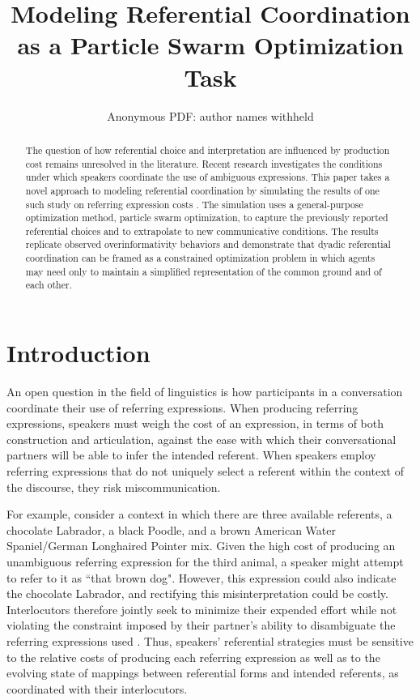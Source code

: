 \documentclass[a4paper,11pt]{article}
\title{Modeling Referential Coordination as a Particle Swarm Optimization Task}
\author{ Anonymous PDF:  author names withheld\\}
\date{}
\begin{document}
\maketitle
\begin{abstract}
The question of how referential choice and interpretation are influenced by production cost remains unresolved in the literature. Recent research \cite{rohde2012,degen2012,frank2012} investigates the conditions under which speakers coordinate the use of ambiguous expressions. This paper takes a novel approach to modeling referential coordination by simulating the results of one such study on referring expression costs \cite{rohde2012}.  The simulation uses a general-purpose optimization method, particle swarm optimization, to capture the previously reported referential choices and to extrapolate to new communicative conditions.  The results replicate observed overinformativity behaviors \cite{brennan1996} and demonstrate that dyadic referential coordination can be framed as a constrained optimization problem in which agents may need only to maintain a simplified representation of the common ground and of each other.
\end{abstract}

\section{Introduction}
An open question in the field of linguistics is how participants in a conversation coordinate their use of referring expressions. When producing referring expressions, speakers must weigh the cost of an expression, in terms of both construction and articulation, against the ease with which their conversational partners will be able to infer the intended referent. When speakers employ referring expressions that do not uniquely select a referent within the context of the discourse, they risk miscommunication.

For example, consider a context in which there are three available referents, a chocolate Labrador, a black Poodle, and a brown American Water Spaniel/German Longhaired Pointer mix. Given the high cost of producing an unambiguous referring expression for the third animal, a speaker might attempt to refer to it as ``that brown dog". However, this expression could also indicate the chocolate Labrador, and rectifying this misinterpretation could be costly. Interlocutors therefore jointly seek to minimize their expended effort while not violating the constraint imposed by their partner's ability to disambiguate the referring expressions used \cite{benz2005}. Thus, speakers' referential strategies must be sensitive to the relative costs of producing each referring expression as well as to the evolving state of mappings between referential forms and intended referents, as coordinated with their interlocutors. 
\end{document}
